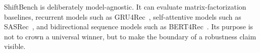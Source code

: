 ShiftBench is deliberately model-agnostic.  It can evaluate matrix-factorization
baselines, recurrent models such as GRU4Rec~\cite{Hidasi2016}, self-attentive
models such as SASRec~\cite{Kang2018}, and bidirectional sequence models such as
BERT4Rec~\cite{Sun2019}.  Its purpose is not to crown a universal winner, but to
make the boundary of a robustness claim visible.
